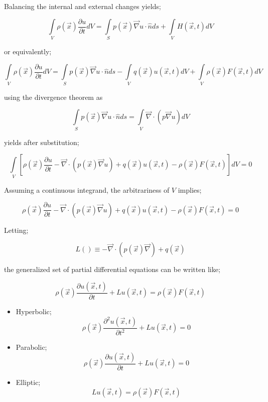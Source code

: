 Balancing the internal and external changes yields;

\[\int\limits_V {\rho (\vec x)\frac{{\partial u}}{{\partial t}}dV = \int\limits_S {p(\vec x)\vec \nabla u \cdot \hat nds} }  + \int\limits_V {H(\vec x,t)dV} \]

or equivalently;

\[\int\limits_V {\rho (\vec x)\frac{{\partial u}}{{\partial t}}dV = \int\limits_S {p(\vec x)\vec \nabla u \cdot \hat nds} }  - \int\limits_V {q(\vec x)u(\vec x,t)dV}  + \int\limits_V {\rho (\vec x)F(\vec x,t)dV} \]

using the divergence theorem as

\[\int\limits_S {p(\vec x)\vec \nabla u \cdot \hat nds}  = \int\limits_V {\vec \nabla  \cdot \left( {p\vec \nabla u} \right)dV} \]

yields after substitution;

\[\int\limits_V {\left[ {\rho (\vec x)\frac{{\partial u}}{{\partial t}} - \vec \nabla  \cdot \left( {p(\vec x)\vec \nabla u} \right) + q(\vec x)u(\vec x,t) - \rho (\vec x)F(\vec x,t)} \right]dV}  = 0\]

Assuming a continuous integrand, the arbitrariness of $V$ implies;

\[
\rho (\vec x)\frac{{\partial u}}{{\partial t}} - \vec \nabla  \cdot \left( {p(\vec x)\vec \nabla u} \right) + q(\vec x)u(\vec x,t) - \rho (\vec x)F(\vec x,t) = 0
\]

Letting;

\[L() \equiv  - \vec \nabla  \cdot \left( {p(\vec x)\vec \nabla } \right) + q(\vec x)\]

the generalized set of partial differential equations can be written like;

\begin{equation}
\rho (\vec x)\frac{{\partial u(\vec x,t)}}{{\partial t}} + Lu(\vec x,t) = \rho (\vec x)F(\vec x,t)
\label{GenPDE}
\end{equation}

\begin{itemize}
\item Hyperbolic;
\[\rho (\vec x)\frac{{{\partial ^2}u(\vec x,t)}}{{\partial {t^2}}} + Lu(\vec x,t) = 0\]

\item Parabolic;
\[\rho (\vec x)\frac{{\partial u(\vec x,t)}}{{\partial t}} + Lu(\vec x,t) = 0\]

\item Elliptic;
\[Lu(\vec x,t) = \rho (\vec x)F(\vec x,t)\]
 
\end{itemize}

